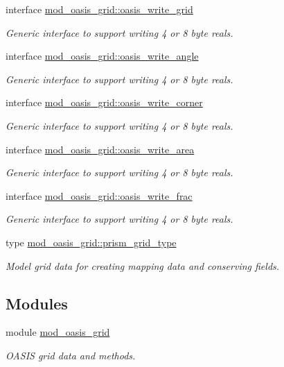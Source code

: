 \begin{DoxyCompactItemize}
\item 
interface \hyperlink{interfacemod__oasis__grid_1_1oasis__write__grid}{mod\+\_\+oasis\+\_\+grid\+::oasis\+\_\+write\+\_\+grid}
\begin{DoxyCompactList}\small\item\em Generic interface to support writing 4 or 8 byte reals. \end{DoxyCompactList}\item 
interface \hyperlink{interfacemod__oasis__grid_1_1oasis__write__angle}{mod\+\_\+oasis\+\_\+grid\+::oasis\+\_\+write\+\_\+angle}
\begin{DoxyCompactList}\small\item\em Generic interface to support writing 4 or 8 byte reals. \end{DoxyCompactList}\item 
interface \hyperlink{interfacemod__oasis__grid_1_1oasis__write__corner}{mod\+\_\+oasis\+\_\+grid\+::oasis\+\_\+write\+\_\+corner}
\begin{DoxyCompactList}\small\item\em Generic interface to support writing 4 or 8 byte reals. \end{DoxyCompactList}\item 
interface \hyperlink{interfacemod__oasis__grid_1_1oasis__write__area}{mod\+\_\+oasis\+\_\+grid\+::oasis\+\_\+write\+\_\+area}
\begin{DoxyCompactList}\small\item\em Generic interface to support writing 4 or 8 byte reals. \end{DoxyCompactList}\item 
interface \hyperlink{interfacemod__oasis__grid_1_1oasis__write__frac}{mod\+\_\+oasis\+\_\+grid\+::oasis\+\_\+write\+\_\+frac}
\begin{DoxyCompactList}\small\item\em Generic interface to support writing 4 or 8 byte reals. \end{DoxyCompactList}\item 
type \hyperlink{structmod__oasis__grid_1_1prism__grid__type}{mod\+\_\+oasis\+\_\+grid\+::prism\+\_\+grid\+\_\+type}
\begin{DoxyCompactList}\small\item\em Model grid data for creating mapping data and conserving fields. \end{DoxyCompactList}\end{DoxyCompactItemize}
\subsection*{Modules}
\begin{DoxyCompactItemize}
\item 
module \hyperlink{namespacemod__oasis__grid}{mod\+\_\+oasis\+\_\+grid}
\begin{DoxyCompactList}\small\item\em O\+A\+S\+IS grid data and methods. \end{DoxyCompactList}\end{DoxyCompactItemize}
